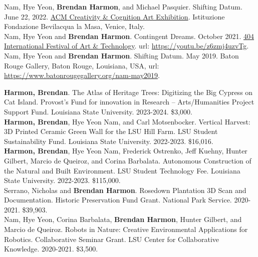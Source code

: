 \documentclass[10pt]{developercv} %
\begin{document}
Nam, Hye Yeon, \textbf{Brendan Harmon}, and Michael Pasquier. Shifting Datum. June 22, 2022. \href{https://cc.acm.org/2022/}{ACM Creativity \& Cognition Art Exhibition}. Istituzione Fondazione Bevilacqua la Masa, Venice, Italy.\\

Nam, Hye Yeon and \textbf{Brendan Harmon}. Contingent Dreams. October 2021. \href{https://www.404festival.com}{404 International Festival of Art \& Technology}. url: \url{https://youtu.be/z6zmj4uzvTg}.\\

Nam, Hye Yeon and \textbf{Brendan Harmon}. Shifting Datum. May 2019. Baton Rouge Gallery, Baton Rouge, Louisiana, USA, url: \url{https://www.batonrougegallery.org/nam-may2019}.\\




\textbf{Harmon, Brendan}.
The Atlas of Heritage Trees: Digitizing the Big Cypress on Cat Island.
Provost's Fund for innovation in Research -- Arts/Humanities Project Support Fund. 
Louisiana State University. 
2023-2024. \$3,000.\\

\textbf{Harmon, Brendan}, Hye Yeon Nam, and Carl Motsenbocker.
Vertical Harvest: 3D Printed Ceramic Green Wall for the LSU Hill Farm.
LSU Student Sustainability Fund. 
Louisiana State University. 
2022-2023. \$16,016.\\

\textbf{Harmon, Brendan}, Hye Yeon Nam, Frederick Ostrenko, Jeff Kuehny, Hunter Gilbert, Marcio de Queiroz, and Corina Barbalata. 
Autonomous Construction of the Natural and Built Environment.
LSU Student Technology Fee. 
Louisiana State University. 
2022-2023. \$115,000.\\

Serrano, Nicholas and \textbf{Brendan Harmon}. 
Rosedown Plantation 3D Scan and Documentation. 
Historic Preservation Fund Grant. 
National Park Service. 
2020-2021. \$39,903.\\

Nam, Hye Yeon, Corina Barbalata, \textbf{Brendan Harmon}, Hunter Gilbert, and Marcio de Queiroz.
Robots in Nature: Creative Environmental Applications for Robotics.
Collaborative Seminar Grant. 
LSU Center for Collaborative Knowledge.
2020-2021. \$3,500.\\
\end{document}
